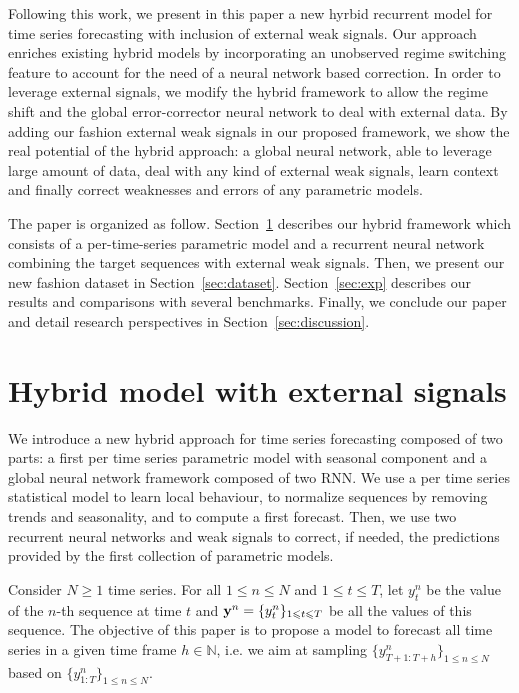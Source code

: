\documentclass{article} %
\newcommand{\ts}{y}
\newcommand{\fullts}{{\bf \ts}}
\newcommand{\lag}{h}
\begin{document}
Following this work, we present in this paper a new hyrbid recurrent model for time series forecasting with inclusion of external weak signals. %
Our approach enriches existing hybrid models by incorporating an unobserved regime switching feature to account for the need of a neural network based correction. In order to leverage external signals, we modify the hybrid framework to allow the regime shift and the  global error-corrector neural network to deal with external data. By adding our fashion external weak signals in our proposed framework, we show the real potential of the hybrid approach: a global neural network, able to leverage large amount of data, deal with any kind of external weak signals, learn context and finally correct weaknesses and errors of any parametric models.

The paper is organized as follow. Section~\ref{sec:hybrid} describes our hybrid framework which consists of a per-time-series parametric model and a recurrent neural network combining the target sequences with external weak signals. Then, we present our new fashion dataset in Section~\ref{sec:dataset}. Section~\ref{sec:exp} describes our results and comparisons with several benchmarks. Finally, we conclude our paper and detail research perspectives in Section~\ref{sec:discussion}.


\section{Hybrid model with external signals}
\label{sec:hybrid}
We introduce a new hybrid approach for time series forecasting  composed of two parts: a first per time series parametric model with seasonal component and a global neural network framework composed of two RNN. We use a per time series statistical model to learn local behaviour, to normalize sequences by removing trends and seasonality,  and to compute a first forecast. Then, we use two recurrent neural networks and weak signals to correct, if needed, the predictions provided by the first collection of parametric models.

Consider $N\geqslant 1$ time series. For all $1\leqslant n \leqslant N$ and $1\leqslant t \leqslant T$, let $\ts_t^n$ be the value of the $n$-th sequence at time $t$ and  $\fullts^n = \{\ts_t^n\}_{1\leqslant t \leqslant T}$ be all the values of this sequence.   The objective of this paper is to propose a model to  forecast all time series in a given time frame  $\lag \in \mathbb{N}$, i.e. we aim at sampling $\{\ts^n_{T+1:T+\lag}\}_{1\leqslant n \leqslant N}$ based on $\{\ts^n_{1:T}\}_{1\leqslant n \leqslant N}$.
\end{document}
